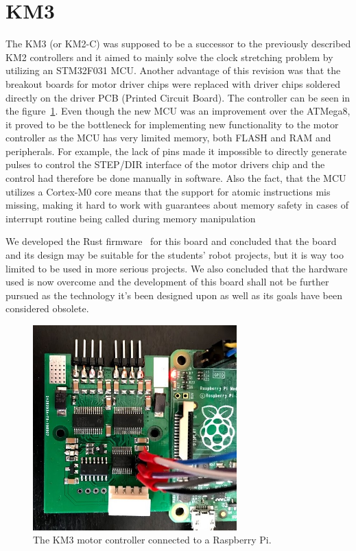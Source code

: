 \section{KM3}
\label{sec:km3}
The KM3 (or KM2-C) was supposed to be a successor to the previously described KM2 controllers and it aimed to mainly solve the clock stretching problem by utilizing an STM32F031 MCU.
Another advantage of this revision was that the breakout boards for motor driver chips were replaced with driver chips soldered directly on the driver PCB (Printed Circuit Board).
The controller can be seen in the figure~\ref{fig:km3}.
Even though the new MCU was an improvement over the ATMega8, it proved to be the bottleneck for implementing new functionality to the motor controller as the MCU has very limited memory, both FLASH and RAM and peripherals.
For example, the lack of pins made it impossible to directly generate pulses to control the STEP/DIR interface of the motor drivers chip and the control had therefore be done manually in software.
Also the fact, that the MCU utilizes a Cortex-M0 core means that the support for atomic instructions mis missing, making it hard to work with guarantees about memory safety in cases of interrupt routine being called during memory manipulation

We developed the Rust firmware~\cite{hybl_robotics-butkm3-rs_2020} for this board and concluded that the board and its design may be suitable for the students' robot projects, but it is way too limited to be used in more serious projects.
We also concluded that the hardware used is now overcome and the development of this board shall not be further pursued as the technology it's been designed upon as well as its goals have been considered obsolete.

\begin{figure}[H]
    \centering
    \includegraphics[width=0.7\textwidth]{obrazky/km3}
    \caption{The KM3 motor controller connected to a Raspberry Pi.}
    \label{fig:km3}
\end{figure}

